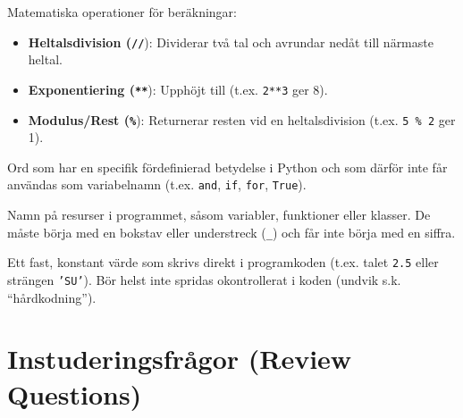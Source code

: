 \documentclass[11pt,a4paper]{article}
\begin{document}
\begin{description}[style=nextline, leftmargin=1cm, labelindent=0.5cm]
\begin{itemize}
    \end{itemize}
    \item[\color{primary}Aritmetiska operationer] Matematiska operationer för beräkningar:
    \begin{itemize}
        \item \textbf{Heltalsdivision (\texttt{//}}): Dividerar två tal och avrundar nedåt till närmaste heltal.
        \item \textbf{Exponentiering (\texttt{**}}): Upphöjt till (t.ex. \texttt{2**3} ger 8).
        \item \textbf{Modulus/Rest (\texttt{\%}}): Returnerar resten vid en heltalsdivision (t.ex. \texttt{5 \% 2} ger 1).
    \end{itemize}
    \item[\color{primary}Reserverade ord (Keywords)] Ord som har en specifik fördefinierad betydelse i Python och som därför inte får användas som variabelnamn (t.ex. \texttt{and}, \texttt{if}, \texttt{for}, \texttt{True}).
    \item[\color{primary}Identifierare (Identifiers)] Namn på resurser i programmet, såsom variabler, funktioner eller klasser. De måste börja med en bokstav eller understreck (\texttt{\_}) och får inte börja med en siffra.
    \item[\color{primary}Litteral] Ett fast, konstant värde som skrivs direkt i programkoden (t.ex. talet \texttt{2.5} eller strängen \texttt{'SU'}). Bör helst inte spridas okontrollerat i koden (undvik s.k. ``hårdkodning'').
\end{description}


\section*{Instuderingsfrågor (Review Questions)}
\end{document}
